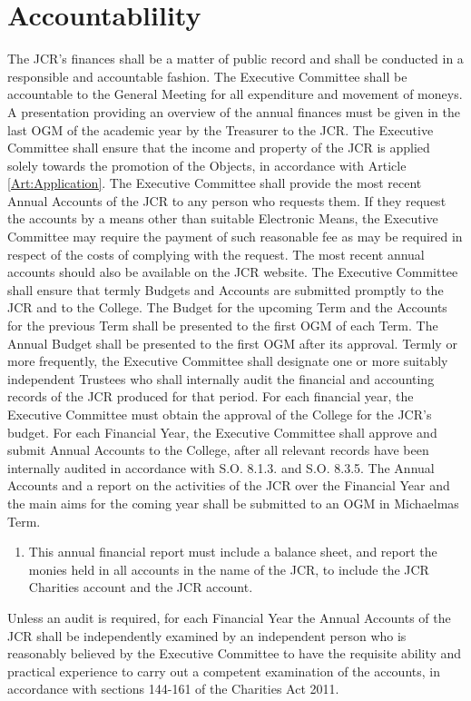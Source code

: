 \section{Accountablility}
\npara The JCR's finances shall be a matter of public record and shall be conducted in a responsible and accountable fashion.  The Executive Committee shall be accountable to the General Meeting for all expenditure and movement of moneys. A presentation providing an overview of the annual finances must be given in the last OGM of the academic year by the Treasurer to the JCR.
\npara The Executive Committee shall ensure that the income and property of the JCR is applied solely towards the promotion of the Objects, in accordance with Article \ref{Art:Application}.
\npara The Executive Committee shall provide the most recent Annual Accounts of the JCR to any person who requests them.  If they request the accounts by a means other than suitable Electronic Means, the Executive Committee may require the payment of such reasonable fee as may be required in respect of the costs of complying with the request. The most recent annual accounts should also be available on the JCR website.
\npara The Executive Committee shall ensure that termly Budgets and Accounts are submitted promptly to the JCR and to the College. The Budget for the upcoming Term and the Accounts for the previous Term shall be presented to the first OGM of each Term.  The Annual Budget shall be presented to the first OGM after its approval.
\npara Termly or more frequently, the Executive Committee shall designate one or more suitably independent Trustees who shall internally audit the financial and accounting records of the JCR produced for that period.
\npara For each financial year, the Executive Committee must obtain the approval of the College for the JCR's budget. 
\npara For each Financial Year, the Executive Committee shall approve and submit Annual Accounts to the College, after all relevant records have been internally audited in accordance with S.O. 8.1.3. and S.O. 8.3.5.  The Annual Accounts and a report on the activities of the JCR over the Financial Year and the main aims for the coming year shall be submitted to an OGM in Michaelmas Term.
\begin{enumerate}
    \item This annual financial report must include a balance sheet, and report the monies held in all accounts in the name of the JCR, to include the JCR Charities account and the JCR account.
\end{enumerate}
\npara Unless an audit is required, for each Financial Year the Annual Accounts of the JCR shall be independently examined by an independent person who is reasonably believed by the Executive Committee to have the requisite ability and practical experience to carry out a competent examination of the accounts, in accordance with sections 144-161 of the Charities Act 2011.
